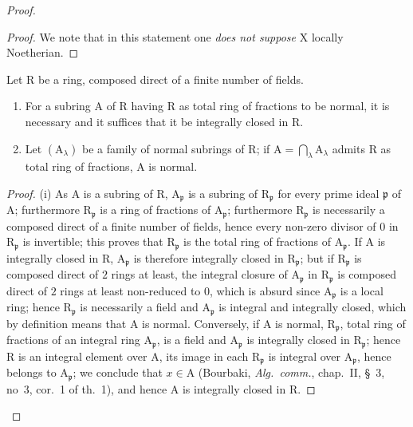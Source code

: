 \begin{proof}
\begin{proof}
We note that in this statement one \emph{does not suppose} $\mathrm{X}$ locally Noetherian.
\end{proof}

\begin{lemma}[6.14.1.1]
\label{IV.6.14.1.1}
Let $\mathrm{R}$ be a ring, composed direct of a finite number of fields.
\begin{enumerate}[label=(\roman*)]
  \item For a subring $\mathrm{A}$ of $\mathrm{R}$ having $\mathrm{R}$ as total ring of fractions to be normal,
it is necessary and it suffices that it be integrally closed in $\mathrm{R}$.
  \item Let $(\mathrm{A}_\lambda)$ be a family of normal subrings of $\mathrm{R}$; if $\mathrm{A}=\bigcap_\lambda\mathrm{A}_\lambda$ admits $\mathrm{R}$ as
total ring of fractions, $\mathrm{A}$ is normal.
\end{enumerate}
\end{lemma}

\begin{proof}
(i) As $\mathrm{A}$ is a subring of $\mathrm{R}$, $\mathrm{A}_\mathfrak{p}$ is a subring of $\mathrm{R}_\mathfrak{p}$ for every
prime ideal $\mathfrak{p}$ of $\mathrm{A}$; furthermore $\mathrm{R}_\mathfrak{p}$ is a ring of fractions of $\mathrm{A}_\mathfrak{p}$; furthermore $\mathrm{R}_\mathfrak{p}$ is necessarily
a composed direct of a finite number of fields, hence every non-zero divisor
of $0$ in $\mathrm{R}_\mathfrak{p}$ is invertible; this proves that $\mathrm{R}_\mathfrak{p}$ is the total ring of fractions of $\mathrm{A}_\mathfrak{p}$.
If $\mathrm{A}$ is integrally closed in $\mathrm{R}$, $\mathrm{A}_\mathfrak{p}$ is therefore integrally closed in $\mathrm{R}_\mathfrak{p}$; but
if $\mathrm{R}_\mathfrak{p}$ is composed direct of $2$ rings at least, the integral closure of $\mathrm{A}_\mathfrak{p}$ in $\mathrm{R}_\mathfrak{p}$ is
composed direct of $2$ rings at least non-reduced to $0$, which is absurd since $\mathrm{A}_\mathfrak{p}$
is a local ring; hence $\mathrm{R}_\mathfrak{p}$ is necessarily a field and $\mathrm{A}_\mathfrak{p}$ is integral and integrally
closed, which by definition means that $\mathrm{A}$ is normal. Conversely, if $\mathrm{A}$ is normal,
$\mathrm{R}_\mathfrak{p}$, total ring of fractions of an integral ring $\mathrm{A}_\mathfrak{p}$, is a field and $\mathrm{A}_\mathfrak{p}$ is integrally
closed in $\mathrm{R}_\mathfrak{p}$; hence $\mathrm{R}$ is an integral element over $\mathrm{A}$, its image in each $\mathrm{R}_\mathfrak{p}$ is
integral over $\mathrm{A}_\mathfrak{p}$, hence belongs to $\mathrm{A}_\mathfrak{p}$; we conclude that $x\in\mathrm{A}$ (Bourbaki, \emph{Alg.~comm.},
chap.~II, \S~3, no~3, cor.~1 of th.~1), and hence $\mathrm{A}$ is integrally closed in $\mathrm{R}$.


\end{proof}
\end{proof}
